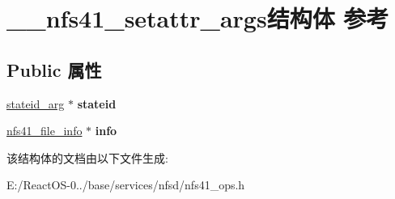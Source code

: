 \hypertarget{struct____nfs41__setattr__args}{}\section{\+\_\+\+\_\+nfs41\+\_\+setattr\+\_\+args结构体 参考}
\label{struct____nfs41__setattr__args}
\subsection*{Public 属性}
\begin{DoxyCompactItemize}
\item 
\mbox{\label{struct____nfs41__setattr__args_a7cc7cac490ccb3360e1e6b02848320de}} 
\hyperlink{struct____stateid__arg}{stateid\+\_\+arg} $\ast$ {\bfseries stateid}
\item 
\mbox{\label{struct____nfs41__setattr__args_ab70728b9384cd26438dd4c21fd10f1bb}} 
\hyperlink{struct____nfs41__file__info}{nfs41\+\_\+file\+\_\+info} $\ast$ {\bfseries info}
\end{DoxyCompactItemize}


该结构体的文档由以下文件生成\+:\begin{DoxyCompactItemize}
\item 
E\+:/\+React\+O\+S-\/0../base/services/nfsd/nfs41\+\_\+ops.\+h\end{DoxyCompactItemize}
